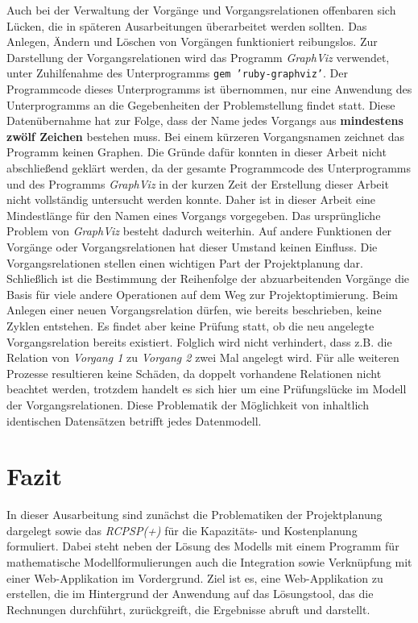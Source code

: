 \documentclass[a4paper,12pt,parskip,bibtotoc,liststotoc]{article}
\begin{document}
Auch bei der Verwaltung der Vorgänge und Vorgangsrelationen offenbaren sich Lücken, die in späteren Ausarbeitungen überarbeitet werden sollten. Das Anlegen, Ändern und Löschen von Vorgängen funktioniert reibungslos. Zur Darstellung der Vorgangsrelationen wird das Programm \textit{GraphViz} verwendet, unter Zuhilfenahme des Unterprogramms \texttt{gem 'ruby-graphviz'}. Der Programmcode dieses Unterprogramms ist übernommen, nur eine Anwendung des Unterprogramms an die Gegebenheiten der Problemstellung findet statt. Diese Datenübernahme hat zur Folge, dass der Name jedes Vorgangs aus \textbf{mindestens zwölf Zeichen} bestehen muss. Bei einem kürzeren Vorgangsnamen zeichnet das Programm keinen Graphen. Die Gründe dafür konnten in dieser Arbeit nicht abschließend geklärt werden, da der gesamte Programmcode des Unterprogramms und des Programms \textit{GraphViz} in der kurzen Zeit der Erstellung dieser Arbeit nicht vollständig untersucht werden konnte. Daher ist in dieser Arbeit eine Mindestlänge für den Namen eines Vorgangs vorgegeben. Das ursprüngliche Problem von \textit{GraphViz} besteht dadurch weiterhin. Auf andere Funktionen der Vorgänge oder Vorgangsrelationen hat dieser Umstand keinen Einfluss. Die Vorgangsrelationen stellen einen wichtigen Part der Projektplanung dar. Schließlich ist die Bestimmung der Reihenfolge der abzuarbeitenden Vorgänge die Basis für viele andere Operationen auf dem Weg zur Projektoptimierung. Beim Anlegen einer neuen Vorgangsrelation dürfen, wie bereits beschrieben, keine Zyklen entstehen. Es findet aber keine Prüfung statt, ob die neu angelegte Vorgangsrelation bereits existiert. Folglich wird nicht verhindert, dass z.B. die Relation von \textit{Vorgang 1} zu \textit{Vorgang 2} zwei Mal angelegt wird. Für alle weiteren Prozesse resultieren keine Schäden, da doppelt vorhandene Relationen nicht beachtet werden, trotzdem handelt es sich hier um eine Prüfungslücke im Modell der Vorgangsrelationen. Diese Problematik der Möglichkeit von inhaltlich identischen Datensätzen betrifft jedes Datenmodell.\\      
\newpage
\section{Fazit} \label{Fazit}
In dieser Ausarbeitung sind zunächst die Problematiken der Projektplanung dargelegt sowie das \textit{RCPSP(+)} für die Kapazitäts- und Kostenplanung formuliert. Dabei steht neben der Lösung des Modells mit einem Programm für mathematische Modellformulierungen auch die Integration sowie Verknüpfung mit einer Web-Applikation im Vordergrund. Ziel ist es, eine Web-Applikation zu erstellen, die im Hintergrund der Anwendung auf das Lösungstool, das die Rechnungen durchführt, zurückgreift, die Ergebnisse abruft und darstellt.\\
\end{document}
